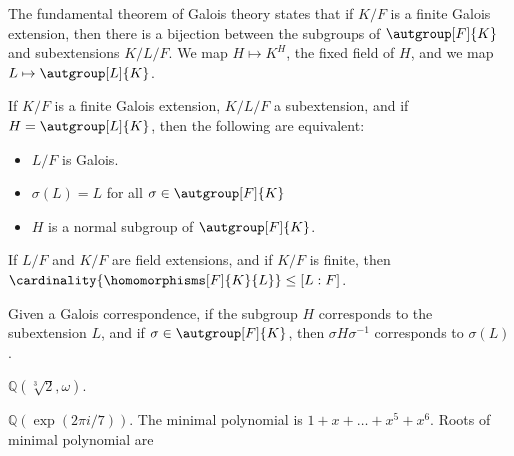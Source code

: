 \documentclass{article}                                                        %
\begin{document}
        The fundamental theorem of Galois theory states that if $K/F$ is a
        finite Galois extension, then there is a bijection between the subgroups
        of $\autgroup[F]{K}$ and subextensions $K/L/F$. We map
        $H\mapsto{K}^{H}$, the fixed field of $H$, and we map
        $L\mapsto\autgroup[L]{K}$.
        \begin{theorem}
            If $K/F$ is a finite Galois extension, $K/L/F$ a subextension, and
            if $H=\autgroup[L]{K}$, then the following are equivalent:
            \begin{itemize}
                \item $L/F$ is Galois.
                \item $\sigma(L)=L$ for all $\sigma\in\autgroup[F]{K}$
                \item $H$ is a normal subgroup of $\autgroup[F]{K}$.
            \end{itemize}
        \end{theorem}
        \begin{theorem}
            If $L/F$ and $K/F$ are field extensions, and if $K/F$ is finite,
            then $\cardinality{\homomorphisms[F]{K}{L}}\leq[L:F]$.
        \end{theorem}
        \begin{theorem}
            Given a Galois correspondence, if the subgroup $H$ corresponds to
            the subextension $L$, and if $\sigma\in\autgroup[F]{K}$, then
            $\sigma{H}\sigma^{\minus{1}}$ corresponds to $\sigma(L)$.
        \end{theorem}
        \begin{example}
            $\mathbb{Q}(\sqrt[3]{2},\omega)$.
        \end{example}
        \begin{example}
            $\mathbb{Q}(\exp(2\pi{i}/7))$. The minimal polynomial is
            $1+x+\dots+x^{5}+x^{6}$. Roots of minimal polynomial are 
        \end{example}
\end{document}
